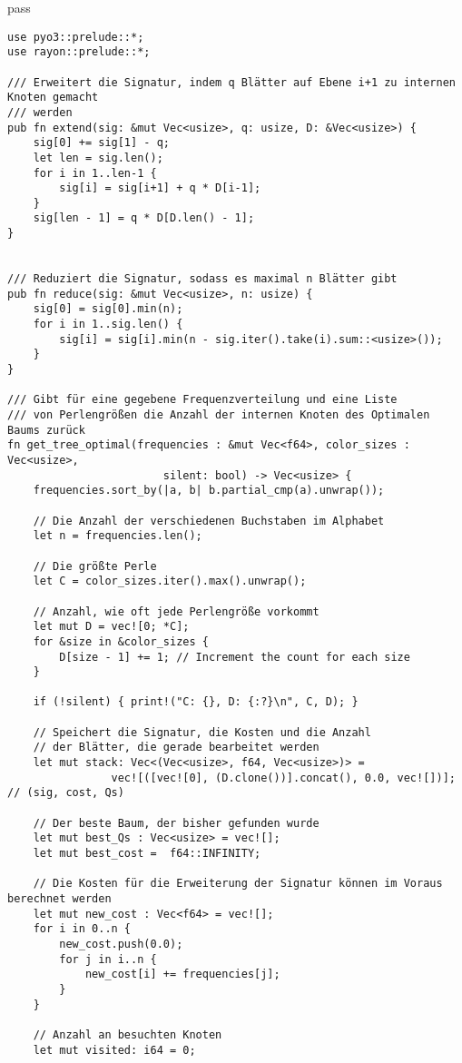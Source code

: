 pass\documentclass[a4paper,10pt,ngerman]{scrartcl}
\begin{document}
    \begin{verbatim}
use pyo3::prelude::*;
use rayon::prelude::*;

/// Erweitert die Signatur, indem q Blätter auf Ebene i+1 zu internen Knoten gemacht
/// werden
pub fn extend(sig: &mut Vec<usize>, q: usize, D: &Vec<usize>) {
    sig[0] += sig[1] - q;
    let len = sig.len();
    for i in 1..len-1 {
        sig[i] = sig[i+1] + q * D[i-1];
    }
    sig[len - 1] = q * D[D.len() - 1];
}


/// Reduziert die Signatur, sodass es maximal n Blätter gibt
pub fn reduce(sig: &mut Vec<usize>, n: usize) {
    sig[0] = sig[0].min(n);
    for i in 1..sig.len() {
        sig[i] = sig[i].min(n - sig.iter().take(i).sum::<usize>());
    }
}

/// Gibt für eine gegebene Frequenzverteilung und eine Liste
/// von Perlengrößen die Anzahl der internen Knoten des Optimalen Baums zurück
fn get_tree_optimal(frequencies : &mut Vec<f64>, color_sizes : Vec<usize>,
                        silent: bool) -> Vec<usize> {
    frequencies.sort_by(|a, b| b.partial_cmp(a).unwrap());

    // Die Anzahl der verschiedenen Buchstaben im Alphabet
    let n = frequencies.len();

    // Die größte Perle
    let C = color_sizes.iter().max().unwrap();

    // Anzahl, wie oft jede Perlengröße vorkommt
    let mut D = vec![0; *C];
    for &size in &color_sizes {
        D[size - 1] += 1; // Increment the count for each size
    }

    if (!silent) { print!("C: {}, D: {:?}\n", C, D); }

    // Speichert die Signatur, die Kosten und die Anzahl
    // der Blätter, die gerade bearbeitet werden
    let mut stack: Vec<(Vec<usize>, f64, Vec<usize>)> =
                vec![([vec![0], (D.clone())].concat(), 0.0, vec![])]; // (sig, cost, Qs)

    // Der beste Baum, der bisher gefunden wurde
    let mut best_Qs : Vec<usize> = vec![];
    let mut best_cost =  f64::INFINITY;

    // Die Kosten für die Erweiterung der Signatur können im Voraus berechnet werden
    let mut new_cost : Vec<f64> = vec![];
    for i in 0..n {
        new_cost.push(0.0);
        for j in i..n {
            new_cost[i] += frequencies[j];
        }
    }

    // Anzahl an besuchten Knoten
    let mut visited: i64 = 0;


\end{verbatim}
\end{document}
